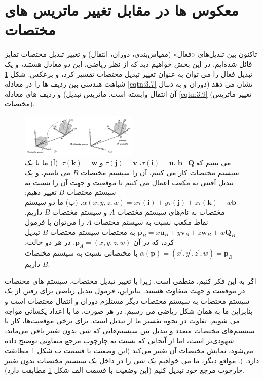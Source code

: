 \section{\textbf{معکوس ها در مقابل تغییر ماتریس های مختصات}}
\label{sec:3.5}
{
    \Large
    \begin{spacing}{1.5}
        تاکنون بین تبدیل‌های «فعال» (مقیاس‌بندی، دوران، انتقال) و تغییر تبدیل مختصات تمایز قائل شده‌ایم.
        در این بخش خواهیم دید که از نظر ریاضی، این دو معادل هستند، و یک تبدیل فعال را می توان به عنوان تغییر تبدیل مختصات تفسیر کرد، و برعکس.
        شکل \ref{fig:4.Session.1.3.15} شباهت هندسی بین ردیف ها را در معادله \ref{eqtn:3.7} نشان می دهد (دوران و به دنبال آن انتقال وابسته است. ماتریس تبدیل) و ردیف های معادله \ref{eqtn:3.9} (تغییر ماتریس مختصات).

        \begin{figure}[H]
            \centering
            \setlength{\belowcaptionskip}{-10pt}
            \includegraphics[width=0.5\textwidth]{Images/4/3/4.Session.1.3.15}
            \caption {می بینیم که$\textbf{b}=\textbf{Q}$،$\tau(\textbf{i})=\textbf{u}$، $\tau(\textbf{j})=\textbf{v}$ و $\tau(\textbf{k})=\textbf{w}$.
                (آ) ما با یک سیستم مختصات کار می کنیم، آن را سیستم مختصات $B$ می نامیم، و یک تبدیل آفینی به مکعب اعمال می کنیم
                تا موقعیت و جهت آن را نسبت به سیستم مختصات $B$ تغییر دهیم: $\alpha(x,y,z,w)=x\tau(\textbf{i})+y\tau(\textbf{j})+z\tau(\textbf{k})+w\textbf{b}$.
                (ب) ما دو سیستم مختصات به نام‌های سیستم مختصات $A$ و سیستم مختصات $B$ داریم.
                نقاط مکعب نسبت به سیستم مختصات $A$ را می‌توان با فرمول $\textbf{p}_{B}=x\textbf{u}_{B}+y\textbf{v}_{B}+z\textbf{w}_{B}+w\textbf{Q}_{B}$ به مختصات سیستم مختصات $B$ تبدیل کرد، که در آن $\textbf{p}_{A}=(x,y,z,w)$.
                در هر دو حالت، $\alpha(\textbf{p})=(x^\prime,y^\prime,z^\prime,w)=\textbf{p}_{B}$ با مختصاتی نسبت به سیستم مختصات $B$ داریم.}
            \label{fig:4.Session.1.3.15}
        \end{figure}

        اگر به این فکر کنیم، منطقی است. زیرا با تغییر تبدیل مختصات، سیستم های مختصات در موقعیت و جهت متفاوت هستند.
        بنابراین، فرمول تبدیل ریاضی برای رفتن از یک سیستم مختصات به سیستم مختصات دیگر مستلزم دوران و انتقال مختصات است
        و بنابراین ما به همان شکل ریاضی می رسیم. در هر صورت، ما با اعداد یکسانی مواجه می شویم.
        تفاوت در نحوه تفسیر ما از تبدیل است. برای برخی موقعیت‌ها، کار با سیستم‌های مختصات متعدد و تبدیل بین سیستم‌هایی که شی بدون تغییر باقی می‌ماند، شهودی‌تر است،
        اما از آنجایی که نسبت به چارچوب مرجع متفاوتی توضیح داده می‌شود، نمایش مختصات آن تغییر می‌کند (این وضعیت با قسمت ب شکل \ref{fig:4.Session.1.3.15} مطابقت دارد. ).
        مواقع دیگر، ما می خواهیم یک شی را در داخل یک سیستم مختصات بدون تغییر چارچوب مرجع خود تبدیل کنیم (این وضعیت با قسمت الف شکل \ref{fig:4.Session.1.3.15} مطابقت دارد).


\end{spacing}}
